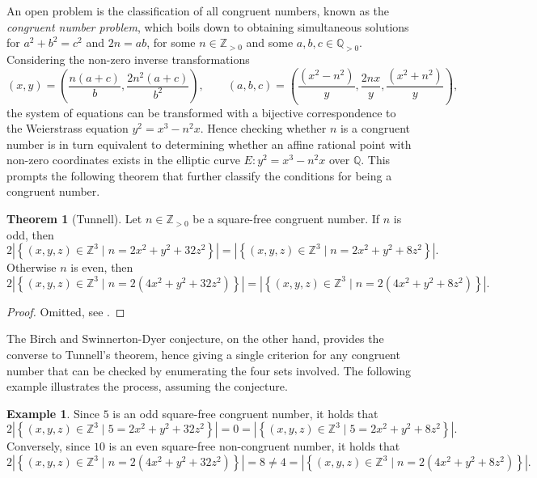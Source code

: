 \documentclass{article}
\newcommand{\Z}{\mathbb{Z}}
\newcommand{\Q}{\mathbb{Q}}
\newcommand{\rb}[1]{\left( #1 \right)}
\newcommand{\cb}[1]{\left\{ #1 \right\}}
\newcommand{\abs}[1]{\left\lvert #1 \right\rvert}
\theoremstyle{definition}\newtheorem*{definition}{Definition}
\theoremstyle{definition}\newtheorem*{example}{Example}
\theoremstyle{definition}\newtheorem*{remark}{Remark}
\newtheorem{theorem}[proposition]{Theorem}
\begin{document}
An open problem is the classification of all congruent numbers, known as the \emph{congruent number problem}, which boils down to obtaining simultaneous solutions for $ a^2 + b^2 = c^2 $ and $ 2n = ab $, for some $ n \in \Z_{> 0} $ and some $ a, b, c \in \Q_{> 0} $. Considering the non-zero inverse transformations
$$ \rb{x, y} = \rb{\dfrac{n\rb{a + c}}{b}, \dfrac{2n^2\rb{a + c}}{b^2}}, \qquad \rb{a, b, c} = \rb{\dfrac{\rb{x^2 - n^2}}{y}, \dfrac{2nx}{y}, \dfrac{\rb{x^2 + n^2}}{y}}, $$
the system of equations can be transformed with a bijective correspondence to the Weierstrass equation $ y^2 = x^3 - n^2x $. Hence checking whether $ n $ is a congruent number is in turn equivalent to determining whether an affine rational point with non-zero coordinates exists in the elliptic curve $ E : y^2 = x^3 - n^2x $ over $ \Q $. This prompts the following theorem that further classify the conditions for being a congruent number.

\begin{theorem}[Tunnell]
Let $ n \in \Z_{> 0} $ be a square-free congruent number. If $ n $ is odd, then
$$ 2\abs{\cb{\rb{x, y, z} \in \Z^3 \mid n = 2x^2 + y^2 + 32z^2}} = \abs{\cb{\rb{x, y, z} \in \Z^3 \mid n = 2x^2 + y^2 + 8z^2}}. $$
Otherwise $ n $ is even, then
$$ 2\abs{\cb{\rb{x, y, z} \in \Z^3 \mid n = 2\rb{4x^2 + y^2 + 32z^2}}} = \abs{\cb{\rb{x, y, z} \in \Z^3 \mid n = 2\rb{4x^2 + y^2 + 8z^2}}}. $$
\end{theorem}

\begin{proof}
Omitted, see \cite{tunnell}.
\end{proof}

The Birch and Swinnerton-Dyer conjecture, on the other hand, provides the converse to Tunnell's theorem, hence giving a single criterion for any congruent number that can be checked by enumerating the four sets involved. The following example illustrates the process, assuming the conjecture.

\begin{example}
Since $ 5 $ is an odd square-free congruent number, it holds that
$$ 2\abs{\cb{\rb{x, y, z} \in \Z^3 \mid 5 = 2x^2 + y^2 + 32z^2}} = 0 = \abs{\cb{\rb{x, y, z} \in \Z^3 \mid 5 = 2x^2 + y^2 + 8z^2}}. $$
Conversely, since $ 10 $ is an even square-free non-congruent number, it holds that
$$ 2\abs{\cb{\rb{x, y, z} \in \Z^3 \mid n = 2\rb{4x^2 + y^2 + 32z^2}}} = 8 \ne 4 = \abs{\cb{\rb{x, y, z} \in \Z^3 \mid n = 2\rb{4x^2 + y^2 + 8z^2}}}. $$
\end{example}
\end{document}
